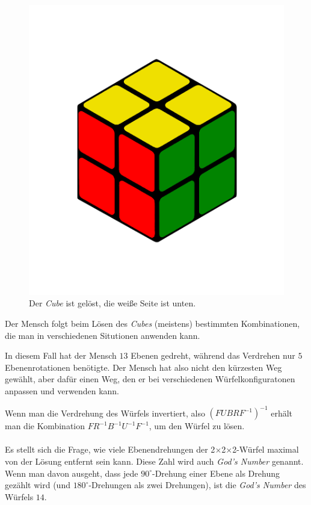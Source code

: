 \documentclass[12pt,a4paper, usenames, dvipsnames]{article}
\newcommand{\Ttwo}{2$\times$2$\times$2-}
\begin{document}
\begin{figure}[H]
\centering
\includegraphics[scale=0.12]{menschSchritt5.png}
\caption[Lösung von Mensch: Schritt 5]{Der \textit{Cube} ist gelöst, die weiße Seite ist unten.}
\label{23}
\end{figure}

Der Mensch folgt beim Lösen des \textit{Cubes} (meistens) bestimmten Kombinationen, die man in verschiedenen Situtionen anwenden kann.  

In diesem Fall hat der Mensch $13$ Ebenen gedreht, während das Verdrehen nur $5$ Ebenenrotationen benötigte. Der Mensch hat also nicht den kürzesten Weg gewählt, aber dafür einen Weg, den er bei verschiedenen Würfelkonfiguratonen anpassen und verwenden kann. 

Wenn man die Verdrehung des Würfels invertiert, also $(FUBRF^{-1})^{-1}$ erhält man die Kombination $FR^{-1}B^{-1}U^{-1}F^{-1}$, um den Würfel zu lösen.
\\
\\
Es stellt sich die Frage, wie viele Ebenendrehungen der \Ttwo Würfel maximal von der Lösung entfernt sein kann. Diese Zahl wird auch \textit{God's Number} genannt. \\
Wenn man davon ausgeht, dass jede $90^\circ$-Drehung einer Ebene als Drehung gezählt wird (und $180^\circ$-Drehungen als zwei Drehungen), ist die \textit{God's Number} des Würfels $14$. \cite{DJ} 
\end{document}
